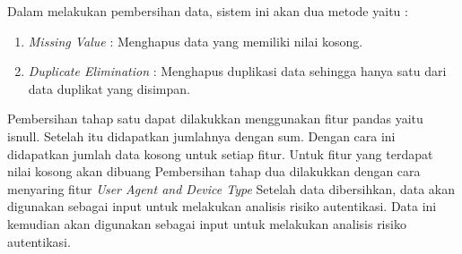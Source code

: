 Dalam melakukan pembersihan data, sistem ini akan dua metode yaitu :

\begin{enumerate}
    \item \textit{Missing Value} : Menghapus data yang memiliki nilai kosong.
    \item \textit{Duplicate Elimination} : Menghapus duplikasi data sehingga hanya satu dari data duplikat yang disimpan. 
\end{enumerate}

Pembersihan tahap satu dapat dilakukkan menggunakan fitur pandas yaitu isnull. Setelah itu didapatkan jumlahnya dengan sum. Dengan cara ini didapatkan jumlah data kosong untuk setiap fitur. Untuk fitur yang terdapat nilai kosong akan dibuang
Pembersihan tahap dua dilakukkan dengan cara menyaring fitur \textit{User Agent and Device Type} 
Setelah data dibersihkan, data akan digunakan sebagai input untuk melakukan analisis risiko autentikasi. Data ini kemudian akan digunakan sebagai input untuk melakukan analisis risiko autentikasi.

